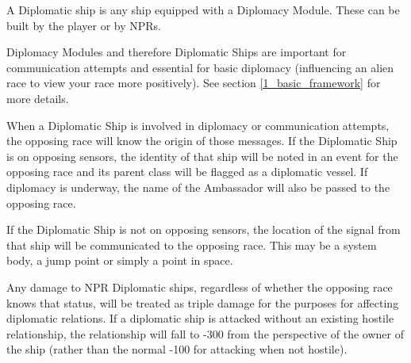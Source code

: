 \documentclass[../Aurora C# unofficial manual.tex]{subfiles}
\begin{document}
	A Diplomatic ship is any ship equipped with a Diplomacy Module. These can be built by the player or by NPRs.
	
	Diplomacy Modules and therefore Diplomatic Ships are important for communication attempts and essential for basic diplomacy (influencing an alien race to view your race more positively). See section \ref{1_basic_framework} for more details.
	
	When a Diplomatic Ship is involved in diplomacy or communication attempts, the opposing race will know the origin of those messages. If the Diplomatic Ship is on opposing sensors, the identity of that ship will be noted in an event for the opposing race and its parent class will be flagged as a diplomatic vessel. If diplomacy is underway, the name of the Ambassador will also be passed to the opposing race.
	
	If the Diplomatic Ship is not on opposing sensors, the location of the signal from that ship will be communicated to the opposing race. This may be a system body, a jump point or simply a point in space.
	
	Any damage to NPR Diplomatic ships, regardless of whether the opposing race knows that status, will be treated as triple damage for the purposes for affecting diplomatic relations. If a diplomatic ship is attacked without an existing hostile relationship, the relationship will fall to -300 from the perspective of the owner of the ship (rather than the normal -100 for attacking when not hostile).
\end{document}
